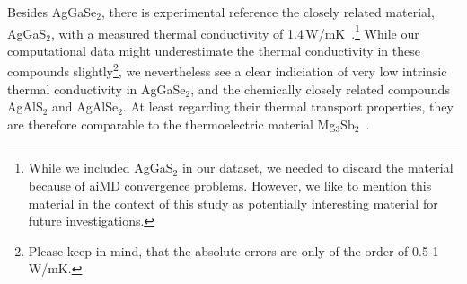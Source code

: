 %
Besides AgGaSe$_2$, there is experimental reference the closely related material, AgGaS$_2$, with a measured thermal conductivity of 1.4\,W/mK~\cite{beasley1994}.\footnote{While we included AgGaS$_2$ in our dataset, we needed to discard the material because of aiMD convergence problems. However, we like to mention this material in the context of this study as potentially interesting material for future investigations.} While our computational data might underestimate the thermal conductivity in these compounds slightly\footnote{Please keep in mind, that the absolute errors are only of the order of 0.5-1\,W/mK.}, we nevertheless see a clear indiciation of very low intrinsic thermal conductivity in AgGaSe$_2$, and the chemically closely related compounds AgAlS$_2$ and AgAlSe$_2$. At least regarding their thermal transport properties, they are therefore comparable to the thermoelectric material Mg$_3$Sb$_2$~\cite{kajikawa2003,condron2006,zhang2009,zhang2018,pan2020,ding2021}.

